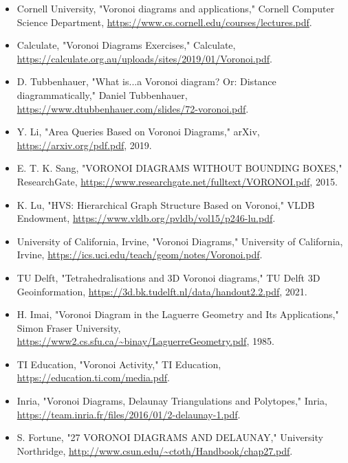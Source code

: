 \documentclass[12pt,a4paper]{report}
\begin{document}
\begin{itemize}
  \item Cornell University, "Voronoi diagrams and applications," Cornell Computer Science Department, \url{https://www.cs.cornell.edu/courses/lectures.pdf}.
  
  \item Calculate, "Voronoi Diagrams Exercises," Calculate, \url{https://calculate.org.au/uploads/sites/2019/01/Voronoi.pdf}.
  
  \item D. Tubbenhauer, "What is...a Voronoi diagram? Or: Distance diagrammatically," Daniel Tubbenhauer, \url{https://www.dtubbenhauer.com/slides/72-voronoi.pdf}.
  
  \item Y. Li, "Area Queries Based on Voronoi Diagrams," arXiv, \url{https://arxiv.org/pdf.pdf}, 2019.
  
  \item E. T. K. Sang, "VORONOI DIAGRAMS WITHOUT BOUNDING BOXES," ResearchGate, \url{https://www.researchgate.net/fulltext/VORONOI.pdf}, 2015.
  
  \item K. Lu, "HVS: Hierarchical Graph Structure Based on Voronoi," VLDB Endowment, \url{https://www.vldb.org/pvldb/vol15/p246-lu.pdf}.
  
  \item University of California, Irvine, "Voronoi Diagrams," University of California, Irvine, \url{https://ics.uci.edu/teach/geom/notes/Voronoi.pdf}.
  
  \item TU Delft, "Tetrahedralisations and 3D Voronoi diagrams," TU Delft 3D Geoinformation, \url{https://3d.bk.tudelft.nl/data/handout2.2.pdf}, 2021.
  
  \item H. Imai, "Voronoi Diagram in the Laguerre Geometry and Its Applications," Simon Fraser University, \url{https://www2.cs.sfu.ca/~binay/LaguerreGeometry.pdf}, 1985.
  
  \item TI Education, "Voronoi Activity," TI Education, \url{https://education.ti.com/media.pdf}.
  
  \item Inria, "Voronoi Diagrams, Delaunay Triangulations and Polytopes," Inria, \url{https://team.inria.fr/files/2016/01/2-delaunay-1.pdf}.
  
  \item S. Fortune, "27 VORONOI DIAGRAMS AND DELAUNAY," University Northridge, \url{http://www.csun.edu/~ctoth/Handbook/chap27.pdf}.
  

\end{itemize}
\end{document}

